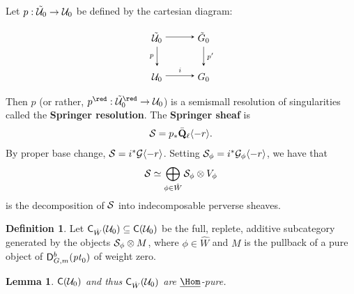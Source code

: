 \documentclass[a4paper,10pt,leqno]{amsart}
\theoremstyle{plain}
\theoremstyle{plain}
\theoremstyle{plain}
\newtheorem{lem}[thm]{Lemma}
\theoremstyle{definition}
\newtheorem{df}[thm]{Definition}
\theoremstyle{remark}
\newcommand{\dfemph}[1]{\textbf{#1}}
\newcommand{\QL}{\bar{\mathbf{Q}}_\ell}
\newcommand{\point}{\mathit{pt}}
\begin{document}
\subsection{}

Let $p : \tilde{\cal{U}}_0 \to \cal{U}_0$ be defined by the cartesian diagram:
\begin{equation}
\begin{tikzpicture}[baseline=(current bounding box.center), >=stealth]
\matrix(m)[matrix of math nodes, row sep=2em, column sep=3em, text height=2.5ex, text depth=0.5ex]
{	\tilde{\cal{U}}_0
		&\tilde{G}_0\\
	\cal{U}_0
		&G_0\\
		};
\path[->,font=\scriptsize, auto]
(m-1-1)		edge (m-1-2)
(m-1-1)		edge node[left]{$p$} (m-2-1)
(m-1-2)		edge node{$p'$} (m-2-2)
(m-2-1)		edge node{$i$} (m-2-2);
\end{tikzpicture}
\end{equation}
Then $p$ (or rather, $p^\red : \tilde{\cal{U}}_0^\red \to \cal{U}_0$) is a semismall resolution of singularities called the \dfemph{Springer resolution}.
The \dfemph{Springer sheaf} is
\begin{align}
\cal{S} = p_\ast \QL\langle -r\rangle.
\end{align}
By proper base change, $\cal{S} = i^\ast \cal{G}\langle -r\rangle$.
Setting $\cal{S}_\phi = i^\ast \cal{G}_\phi \langle -r\rangle$, we have that
\begin{align}
\cal{S} \simeq \bigoplus_{\phi \in \hat{W}} \cal{S}_\phi \otimes V_\phi
\end{align}
is the decomposition of $\cal{S}$ into indecomposable perverse sheaves.

\begin{df}
Let $\sf{C}_{\hat{W}}(\cal{U}_0) \subseteq \sf{C}(\cal{U}_0)$ be the full, replete, additive subcategory generated by the objects $\cal{S}_\phi \otimes M$, where $\phi \in \hat{W}$ and $M$ is the pullback of a pure object of $\sf{D}_{G, m}^b(\point_0)$ of weight zero.
\end{df}

\begin{lem}\label{lem:unipotent}
$\sf{C}(\cal{U}_0)$ and thus $\sf{C}_{\hat{W}}(\cal{U}_0)$ are $\SHom$-pure.
\end{lem}
\end{document}
